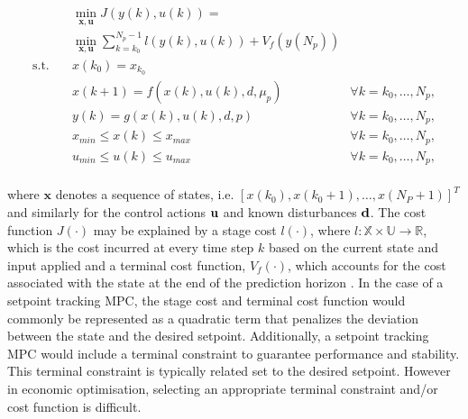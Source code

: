 \begin{equation}
	\begin{aligned}
		& \min_{\mathbf{x},\mathbf{u}} J(y(k),u(k)) = \\ 
		& \min_{\mathbf{x},\mathbf{u}} \sum_{k=k_0}^{N_p-1} l(y(k),u(k)) + V_f(y(N_p))  \\
		\text{s.t.} \quad  & x(k_0) = x_{k_0}                             &\\
		& x(k+1) = f(x(k),u(k),d, \mu_p)       & \forall k = k_0,\hdots, N_p,\\
		& y(k) = g(x(k),u(k),d,p)                 & \forall k = k_0,\hdots, N_p,\\
		& x_{min} \leq x(k) \leq x_{max}                  & \forall k = k_0,\hdots, N_p,\\
		& u_{min} \leq u(k) \leq u_{max}                  & \forall k = k_0,\hdots, N_p,\\
	\end{aligned}
	\label{eq:mcp ocp}
\end{equation}

where $\mathbf{x}$ denotes a sequence of states, i.e. $[x(k_0), x(k_0+1), \hdots, x(N_P+1)]^T$  and similarly for the control actions $\bold{u}$ and known disturbances $\bold{d}$. The cost function $J(\cdot)$ may be explained by a stage cost $l(\cdot)$, where $l: \mathbb X \times \mathbb U \rightarrow \mathbb R$, which is the cost incurred at every time step $k$ based on the current state and input applied and a terminal cost function, $V_f(\cdot)$, which accounts for the cost associated with the state at the end of the prediction horizon \cite{daiDiscreteTimeModelPredictive2012,boersmaRobustSamplebasedModel2022}. In the case of a setpoint tracking MPC, the stage cost and terminal cost function would commonly be represented as a quadratic term that penalizes the deviation between the state and the desired setpoint. Additionally, a setpoint tracking MPC would include a terminal constraint to guarantee performance and stability. This terminal constraint is typically related set to the desired setpoint. However in economic optimisation, selecting an appropriate terminal constraint and/or cost function is difficult.

